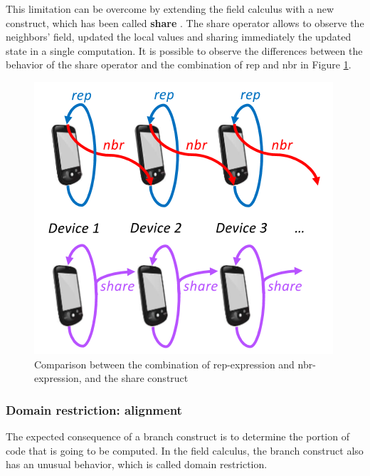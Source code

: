 This limitation can be overcome by extending the field calculus with a new construct, which has been called \textbf{share} \cite{share_operator}. The share operator allows to observe the neighbors' field, updated the local values and sharing immediately the updated state in a single computation. It is possible to observe the differences between the behavior of the share operator and the combination of rep and nbr in Figure \ref{fig:share_operator_introduction}.

\begin{figure}[!ht]
    \centering
    \includegraphics[scale=0.8]{document/chapters/1-introduction/images/share_operator_introduction.png}
    \caption{Comparison between the combination of rep-expression and nbr-expression, and the share construct \cite{share_operator}}
    \label{fig:share_operator_introduction}
\end{figure}

\subsubsection{Domain restriction: alignment}\label{subsection:alignment}
The expected consequence of a branch construct is to determine the portion of code that is going to be computed. In the field calculus, the branch construct also has an unusual behavior, which is called domain restriction.

